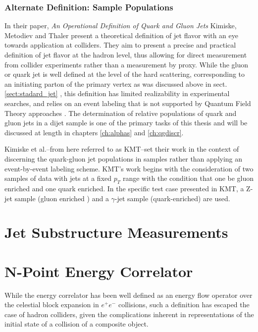 	 \subsubsection{Alternate Definition: Sample Populations}
	\label{sect:alt_jet}
	In their paper, \textit{An Operational Definition of Quark and Gluon Jets} \cite{Komiske2018} Kimiske, Metodiev and Thaler present a theoretical definition of jet flavor with an eye towards application at colliders. 
	They aim to present a precise and practical definition of jet flavor at the hadron level, thus allowing for direct measurement from collider experiments rather than a measurement by proxy. 
	While the gluon or quark jet is well defined at the level of the hard scattering, corresponding to an initiating parton of the primary vertex as was discussed above in sect. \ref{sect:stadard_jet} \cite{Jones1989} \cite{Fodor1990}, this definition has limited realizability in experimental searches, and relies on an event labeling that is not supported by Quantum Field Theory approaches \cite{Komiske2018}.
	The determination of relative populations of quark and gluon jets in a dijet sample is one of the primary tasks of this thesis and will be discussed at length in chapters \ref{ch:alphas} and \ref{ch:qgdiscr}. 

	Kimiske et al.--from here referred to as KMT--set their work in the context of discerning the quark-gluon jet populations in samples rather than applying an event-by-event labeling scheme. 
	KMT's work begins with the consideration of two samples of data with jets at a fixed $p_{T}$ range with the condition that one be gluon enriched and one quark enriched. 
	In the specific test case presented in KMT, a Z-jet sample (gluon enriched ) and a $\gamma$-jet sample (quark-enriched) are used. %



\section{Jet Substructure Measurements}

\section{N-Point Energy Correlator}
	While the energy correlator has been well defined as an energy flow operator over the celestial block expansion in $e^+ e^-$ collisions, such a definition has escaped the case of hadron colliders, given the complications inherent in representations of the initial state of a collision of a composite object. 
%
